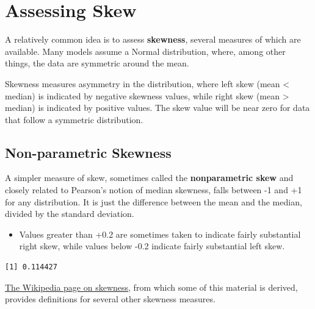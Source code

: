 \documentclass[
]{book}
\newenvironment{Shaded}{\begin{snugshade}}{\end{snugshade}}
\newcommand{\KeywordTok}[1]{\textcolor[rgb]{0.13,0.29,0.53}{\textbf{#1}}}
\newcommand{\NormalTok}[1]{#1}
\newcommand{\OperatorTok}[1]{\textcolor[rgb]{0.81,0.36,0.00}{\textbf{#1}}}
\newcommand{\StringTok}[1]{\textcolor[rgb]{0.31,0.60,0.02}{#1}}
\providecommand{\tightlist}{%
  \setlength{\itemsep}{0pt}\setlength{\parskip}{0pt}}
\begin{document}
\hypertarget{assessing-skew}{%
\section{Assessing Skew}\label{assessing-skew}}

A relatively common idea is to assess \textbf{skewness}, several measures of which are available. Many models assume a Normal distribution, where, among other things, the data are symmetric around the mean.

Skewness measures asymmetry in the distribution, where left skew (mean \textless{} median) is indicated by negative skewness values, while right skew (mean \textgreater{} median) is indicated by positive values. The skew value will be near zero for data that follow a symmetric distribution.

\hypertarget{non-parametric-skewness}{%
\subsection{Non-parametric Skewness}\label{non-parametric-skewness}}

A simpler measure of skew, sometimes called the \textbf{nonparametric skew} and closely related to Pearson's notion of median skewness, falls between -1 and +1 for any distribution. It is just the difference between the mean and the median, divided by the standard deviation.

\begin{itemize}
\tightlist
\item
  Values greater than +0.2 are sometimes taken to indicate fairly substantial right skew, while values below -0.2 indicate fairly substantial left skew.
\end{itemize}

\begin{Shaded}
\end{Shaded}

\begin{verbatim}
[1] 0.114427
\end{verbatim}

\href{https://en.wikipedia.org/wiki/Skewness}{The Wikipedia page on skewness}, from which some of this material is derived, provides definitions for several other skewness measures.
\end{document}
